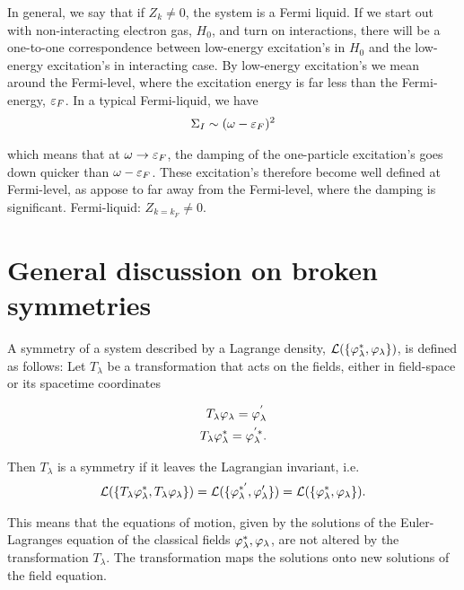 

In general, we say that if $Z_k \neq 0$, the system is a Fermi liquid.
If we start out with non-interacting electron gas, $H_0$, and turn on interactions, there will be a one-to-one correspondence between low-energy excitation's in $H_0$ and the low-energy excitation's in interacting case. By low-energy excitation's we mean around the Fermi-level, where the excitation energy is far less than the Fermi-energy, $\varepsilon_F$. In a typical Fermi-liquid, we have \\ 

\begin{align*}
    \Sigma_I \sim (\omega - \varepsilon_F)^2 
\end{align*}

which means that at $\omega \to \varepsilon_F$, the damping of the one-particle excitation's goes down quicker than $\omega - \varepsilon_F$. These excitation's therefore become well defined at Fermi-level, as appose to far away from the Fermi-level, where the damping is significant. Fermi-liquid: $Z_{k = k_F} \neq 0$. \\

\section{General discussion on broken symmetries}

A symmetry of a system described by a Lagrange density, $\mathcal{L}(\{\varphi_\lambda^*, \varphi_\lambda\})$, is defined as follows: Let $T_\lambda$ be a transformation that acts on the fields, either in field-space or its spacetime coordinates

\begin{align*}
    T_\lambda \varphi_\lambda = \varphi_\lambda^{'} \\ 
    T_\lambda \varphi_\lambda^* = \varphi_\lambda^{'*}. 
\end{align*}

Then $T_\lambda$ is a symmetry if it leaves the Lagrangian invariant, i.e. \\ 

\begin{align*}
    \mathcal{L}(\{T_\lambda \varphi_\lambda^*, T_\lambda \varphi_\lambda\}) = \mathcal{L}(\{\varphi_\lambda^{*'}, \varphi_\lambda'\}) = \mathcal{L}(\{\varphi_\lambda^*, \varphi_\lambda\}).
\end{align*}

This means that the equations of motion, given by the solutions of the Euler-Lagranges equation of the classical fields $\varphi_\lambda^*, \varphi_\lambda$, are not altered by the transformation $T_\lambda$. The transformation maps the solutions onto new solutions of the field equation. \\ 

